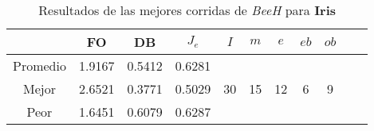 \begin{table}[h!]
\footnotesize
\begin{center}
\begin{tabular}{|c|c|c|c|c|c|c|c|c|c|c|}
\hline
& {\bf FO} & {\bf DB}& $J_e$ & $I$ & $m$ & $e$ & $eb$ & $ob$ \\
\hline
\hline
Promedio   & 1.9167 & 0.5412  & 0.6281 &  &  &  &  & \\
\cline{1-4}
Mejor & 2.6521 & 0.3771  & 0.5029 & 30 & 15 & 12 & 6 & 9\\
\cline{1-4}
Peor & 1.6451 & 0.6079  & 0.6287 &  &  &  &  & \\\hline
\end{tabular}
\caption{Resultados de las mejores corridas de \emph{BeeH} para {\bf Iris}}
\label{tb:pmpbeehibcsv}
\end{center}
\end{table}
